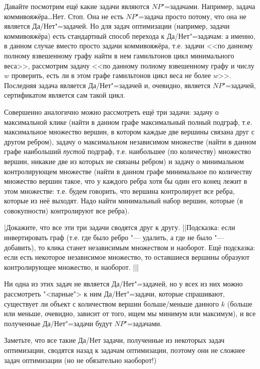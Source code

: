 \documentclass[a4paper,10pt]{problems}
\begin{document}
Давайте посмотрим ещё какие задачи являются $NP$"=задачами. Например, задача 
коммивояжёра\dots Нет. Стоп. Она не есть $NP$"=задача просто потому, что она не 
является Да/Нет"=задачей. Но для задач оптимизации (например, задачи 
коммивояжёра) есть стандартный способ перехода к Да/Нет"=задачам: а именно, в 
данном случае вместо просто задачи коммивояжёра, т.е. задачи <<по данному полному 
взвешенному графу найти в нем гамильтонов цикл минимального веса>>, рассмотрим 
задачу <<по данному полному взвешенному графу и числу $w$ проверить, есть ли в 
этом графе гамильтонов цикл веса не более $w$>>. Последняя задача является 
Да/Нет"=задачей и, очевидно, является $NP$"=задачей, сертификатом является сам 
такой цикл.

Совершенно аналогично можно рассмотреть ещё три задачи: задачу о максимальной 
клике (найти в данном графе максимальный полный подграф, т.е. максимальное 
множество вершин, в котором каждые две вершины связана друг с другом ребром), задачу о 
максимальном независимом множестве (найти в данном графе наибольший 
\textit{пустой} подграф, т.е. наибольшее (по количеству) множество вершин, 
никакие две из которых не связаны ребром) и задачу о минимальном
контролирующем множестве (найти в данном графе минимальное по количеству 
множество вершин такое, что у каждого ребра хотя бы один его конец лежит в этом 
множестве: т.е. будем говорить, что вершина контролирует все ребра, которые из 
неё выходят. Надо найти минимальный набор вершин, которые (в совокупности) 
контролируют все ребра). 

\task|Докажите, что все эти три задачи сводятся друг к другу.
||Подсказка: если инвертировать 
граф (т.е. где было ребро "--- удалить, а где не было "--- добавить), то клика 
станет независимым множеством и наоборот. Ещё подсказка: если есть некоторое 
независимое множество, то оставшиеся вершины образуют контролирующее множество, 
и наоборот.
|||

Ни одна из этих задач не является Да/Нет"=задачей, но 
у всех из них можно рассмотреть "<парные"> к ним Да/Нет"=задачи, которые 
спрашивают, существует ли объект с количеством вершин больше/меньше данного $k$ 
(больше или меньше, очевидно, зависит от того, ищем мы минимум или максимум), и 
все полученные Да/Нет"=задачи будут $NP$"=задачами. 

Заметьте, что все такие Да/Нет задачи, полученные из некоторых задач 
оптимизации, сводятся назад к задачам оптимизации, поэтому они не сложнее задач 
оптимизации (но не обязательно наоборот!)
\end{document}
